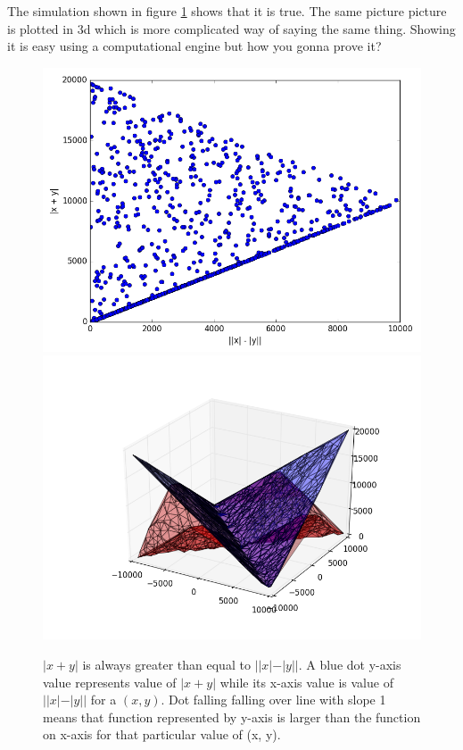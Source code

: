 \documentclass[12pt,answers,addpoints]{exam}
\begin{document}
\begin{questions}
\begin{parts}
        \begin{solution} 

            The simulation shown in figure \ref{fig:2a} shows that it is true. The same
            picture  picture is plotted in 3d which is more complicated way of saying the
            same thing. Showing it is easy using a computational engine but how you gonna
            prove it?

            \begin{figure}[H]
                \includegraphics[width=1\columnwidth]{./sol2_a.py.png}
                \includegraphics[width=1\columnwidth]{./sol2_a.py_3d.png}
                \caption{ $|x+y|$ is always greater than equal to $||x|-|y||$. A blue dot y-axis
                    value represents value of $|x+y|$ while its  x-axis value is value of
                    $||x|-|y||$ for a $(x,y)$. Dot falling
                    falling over line with slope 1 means that function represented by y-axis is
                larger than the function on x-axis for that particular value of (x, y).}
                \label{fig:2a}
            \end{figure}


\end{solution}
\end{parts}
\end{questions}
\end{document}
